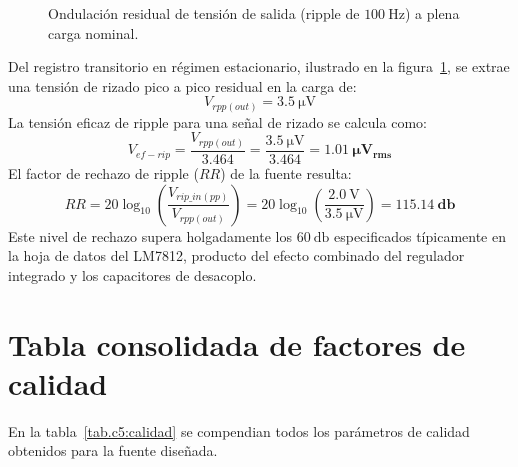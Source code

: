 \begin{figure}[!ht]
    \centering
    
    \caption{Ondulación residual de tensión de salida (ripple de $\SI{100}{\hertz}$) a plena carga nominal.}
    \label{fig.c5:ripple}
\end{figure}

Del registro transitorio en régimen estacionario, ilustrado en la
figura~\ref{fig.c5:ripple}, se extrae una tensión de rizado pico a pico residual en la carga de:
\begin{equation*}
    V_{rpp(out)} = \SI{3.5}{\micro\volt}
\end{equation*}
La tensión eficaz de ripple para una
señal de rizado se calcula como:
\begin{equation*}
    V_{ef-rip} = \frac{V_{rpp(out)}}{3.464} = \frac{\SI{3.5}{\micro\volt}}{3.464} = \mathbf{\SI{1.01}{\micro\volt_{rms}}}
\end{equation*}
El factor de rechazo de ripple ($RR$) de la fuente resulta:
\begin{equation*}
    RR = 20 \log_{10} \left( \frac{V_{rip\_in(pp)}}{V_{rpp(out)}} \right)
       = 20 \log_{10} \left( \frac{\SI{2.0}{\volt}}{\SI{3.5}{\micro\volt}} \right)
       = \mathbf{\SI{115.14}{\decibel}}
\end{equation*}
Este nivel de rechazo supera holgadamente los $\SI{60}{\decibel}$ especificados típicamente en la hoja de datos
del LM7812, producto del efecto combinado del regulador integrado y los capacitores de desacoplo.

\section{Tabla consolidada de factores de calidad}
\label{sec.c5:tabla_calidad}

En la tabla~\ref{tab.c5:calidad} se compendian todos los parámetros de calidad obtenidos para la fuente diseñada.

